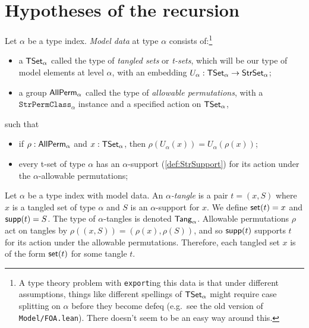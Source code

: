 \section{Hypotheses of the recursion}
\begin{definition}
  \label{def:ModelData}
  Let \( \alpha \) be a type index.
  \emph{Model data} at type \( \alpha \) consists of:\footnote{A type theory problem with \texttt{export}ing this data is that under different assumptions, things like different spellings of \( \mathsf{TSet}_\alpha \) might require case splitting on \( \alpha \) before they become defeq (e.g.\ see the old version of \texttt{Model/FOA.lean}). There doesn't seem to be an easy way around this.}
  \begin{itemize}
    \item a \( \mathsf{TSet}_\alpha \) called the type of \emph{tangled sets} or \emph{t-sets}, which will be our type of model elements at level \( \alpha \), with an embedding \( U_\alpha : \mathsf{TSet}_\alpha \to \mathsf{StrSet}_\alpha \);
    \item a group \( \mathsf{AllPerm}_\alpha \) called the type of \emph{allowable permutations}, with a \( \texttt{StrPermClass}_\alpha \) instance and a specified action on \( \mathsf{TSet}_\alpha \),
  \end{itemize}
  such that
  \begin{itemize}
    \item if \( \rho : \mathsf{AllPerm}_\alpha \) and \( x : \mathsf{TSet}_\alpha \), then \( \rho(U_\alpha(x)) = U_\alpha(\rho(x)) \);
    \item every t-set of type \( \alpha \) has an \( \alpha \)-support (\cref{def:StrSupport}) for its action under the \( \alpha \)-allowable permutations;
  \end{itemize}
\end{definition}
\begin{definition}[tangle]
  \label{def:Tangle}
  Let \( \alpha \) be a type index with model data.
  An \emph{\( \alpha \)-tangle} is a pair \( t = (x, S) \) where \( x \) is a tangled set of type \( \alpha \) and \( S \) is an \( \alpha \)-support for \( x \).
  We define \( \operatorname{\mathsf{set}}(t) = x \) and \( \operatorname{\mathsf{supp}}(t) = S \).
  The type of \( \alpha \)-tangles is denoted \( \mathsf{Tang}_\alpha \).
  Allowable permutations \( \rho \) act on tangles by \( \rho((x, S)) = (\rho(x), \rho(S)) \), and so \( \operatorname{\mathsf{supp}}(t) \) supports \( t \) for its action under the allowable permutations.
  Therefore, each tangled set \( x \) is of the form \( \operatorname{\mathsf{set}}(t) \) for some tangle \( t \).
\end{definition}
